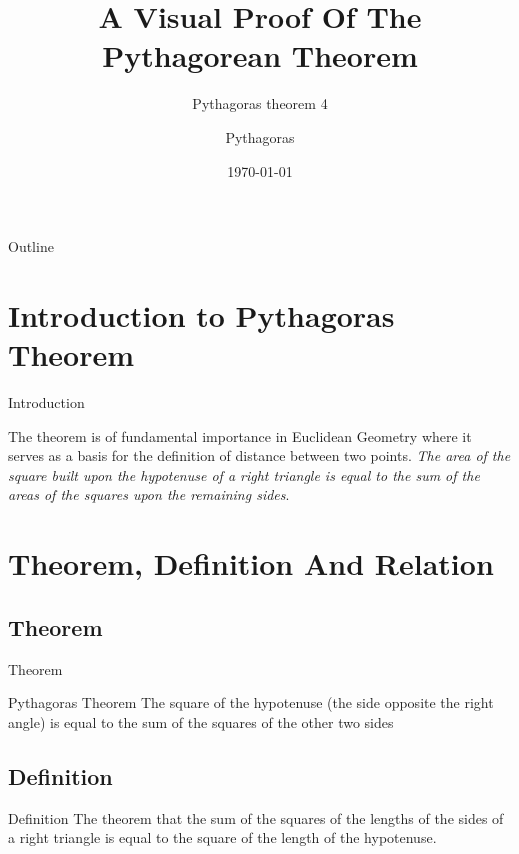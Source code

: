 \documentclass[10pt]{beamer}
\title[Pythagoras theorem 4]{A Visual Proof Of The Pythagorean Theorem}
\subtitle{Pythagoras theorem 4}
\author[Pythagoras of Samos]{Pythagoras}
\date{\today}
\begin{document}
\begin{frame}
	\titlepage			%
\end{frame}

\begin{frame}{Outline}
	\transfade
	\tableofcontents
\end{frame}

\section{Introduction to Pythagoras Theorem}

\begin{frame}{Introduction}
\label{sec:intro}

\transdissolve
The theorem is of fundamental importance in Euclidean Geometry where it serves 
as a basis for the definition of distance between two points.
\emph{The area of the square built upon the hypotenuse of a right
triangle is equal to the sum of the areas of the squares upon the
remaining sides}.
\end{frame}

\section{Theorem, Definition And Relation}
\label{sec:def}
\subsection{Theorem}
\begin{frame}{Theorem}
\begin{block}{Pythagoras Theorem}
\transfade
The square of the hypotenuse (the side opposite the right angle) is equal to the sum of the squares of the other two sides
\end{block}
\end{frame}

\subsection{Definition}
\begin{frame}{Definition}
\transfade
The theorem that the sum of the squares of the lengths of the sides of a right triangle is equal to the square of the length of the hypotenuse.
\end{frame}
\end{document}
